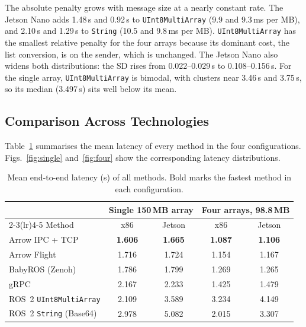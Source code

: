 The absolute penalty grows with message size at a nearly constant rate. The Jetson
Nano adds 1.48\,s and 0.92\,s to \texttt{UInt8MultiArray} (9.9 and 9.3\,ms per MB),
and 2.10\,s and 1.29\,s to \texttt{String} (10.5 and 9.8\,ms per MB).
\texttt{UInt8MultiArray} has the smallest relative penalty for the four arrays because
its dominant cost, the list conversion, is on the sender, which is unchanged. The
Jetson Nano also widens both distributions: the SD rises from 0.022--0.029\,s to
0.108--0.156\,s. For the single array, \texttt{UInt8MultiArray} is bimodal, with
clusters near 3.46\,s and 3.75\,s, so its median (3.497\,s) sits well below its mean.

\subsection{Comparison Across Technologies}
\label{sec:res-comparison}

Table~\ref{tab:summary} summarises the mean latency of every method in the four
configurations. Figs.~\ref{fig:single} and~\ref{fig:four} show the corresponding
latency distributions.

\begin{table}[t]
  \centering
  \caption{Mean end-to-end latency (s) of all methods. Bold marks the fastest
  method in each configuration.}
  \label{tab:summary}
  \small
  \begin{tabular}{lcccc}
    \toprule
    & \multicolumn{2}{c}{Single 150\,MB array} & \multicolumn{2}{c}{Four arrays, 98.8\,MB} \\
    \cmidrule(lr){2-3}\cmidrule(lr){4-5}
    Method & x86 & Jetson & x86 & Jetson \\
    \midrule
    Arrow IPC + TCP                & \textbf{1.606} & \textbf{1.665} & \textbf{1.087} & \textbf{1.106} \\
    Arrow Flight                   & 1.716 & 1.724 & 1.154 & 1.167 \\
    BabyROS (Zenoh)                & 1.786 & 1.799 & 1.269 & 1.265 \\
    gRPC                           & 2.167 & 2.233 & 1.425 & 1.479 \\
    ROS~2 \texttt{UInt8MultiArray} & 2.109 & 3.589 & 3.234 & 4.149 \\
    ROS~2 \texttt{String} (Base64) & 2.978 & 5.082 & 2.015 & 3.307 \\
    \bottomrule
  \end{tabular}
\end{table}

